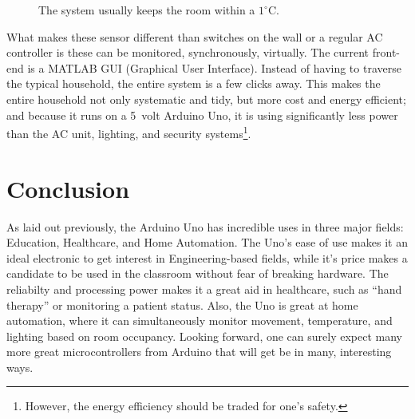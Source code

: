 \documentclass[11pt,letterpaper,twocolumn]{article}
\begin{document}
\begin{figure}
    \centering

    \caption{The system usually keeps the room within a $1^{\circ}\text{C}$.}
\end{figure}

What makes these sensor different than switches on the wall or a regular AC controller is these can be monitored, synchronously, virtually. The current front-end is a MATLAB GUI (Graphical User Interface). Instead of having to traverse the typical household, the entire system is a few clicks away. This makes the entire household not only systematic and tidy, but more cost and energy efficient; and because it runs on a \SI{5}{volt} Arduino Uno, it is using significantly less power than the AC unit, lighting, and security systems\footnote{However, the energy efficiency should be traded for one's safety.}.

\section{Conclusion}
As laid out previously, the Arduino Uno has incredible uses in three major fields: Education, Healthcare, and Home Automation. The Uno's ease of use makes it an ideal electronic to get interest in Engineering-based fields, while it's price makes a candidate to be used in the classroom without fear of breaking hardware. The reliabilty and processing power makes it a great aid in healthcare, such as ``hand therapy'' or monitoring a patient status. Also, the Uno is great at home automation, where it can simultaneously monitor movement, temperature, and lighting based on room occupancy. Looking forward, one can surely expect many more great microcontrollers from Arduino that will get be in many, interesting ways.
\end{document}
